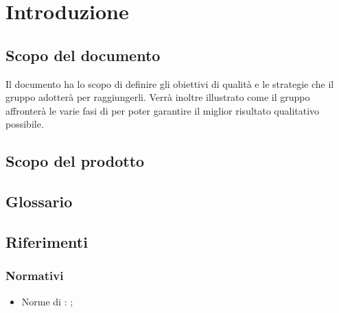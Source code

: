 \documentclass[PdQ.tex]{subfiles}
\begin{document}
\section{Introduzione}
	\subsection{Scopo del documento}
		Il documento ha lo scopo di definire gli obiettivi di qualità e le strategie che il gruppo \GRUPPO{}
		adotterà per raggiungerli. Verrà inoltre illustrato come il gruppo affronterà le varie fasi di 
		per poter garantire il miglior risultato qualitativo possibile.
	\subsection{Scopo del prodotto}
		\SCOPO
	\subsection{Glossario}
		\GLOSSARIO
	\subsection{Riferimenti}
		\subsubsection{Normativi}
			\begin{itemize}
				\item Norme di : \NPdoc{};
			\end{itemize}
\end{document}
